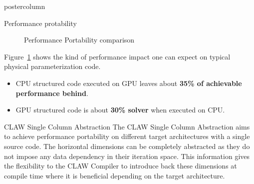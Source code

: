 \documentclass{beamer}
\begin{document}
\begin{frame}
\begin{columns}
\begin{column}{.43\textwidth}
\begin{beamercolorbox}[center]{postercolumn}
\begin{minipage}{.98\textwidth}
{\begin{myblock}{Performance protability}
\begin{figure}[ht]
\caption[Performance Portability comparison]{Performance Portability comparison}
\label{fig:perfportability}
\end{figure}

Figure~\ref{fig:perfportability} shows the kind of performance impact one can
expect on typical physical parameterization code.
\begin{itemize}
  \item CPU structured code executed on GPU leaves about \textbf{35\% of
        achievable performance behind}.
  \item GPU structured code is about \textbf{30\% solver} when executed on CPU.
\end{itemize}

\end{myblock}%

\begin{myblock}{CLAW Single Column Abstraction}
The CLAW Single Column Abstraction aims to achieve performance portability
on different target architectures with a single source code.
The horizontal dimensions can be completely abstracted as they do not impose
any data dependency in their iteration space.
This information gives the flexibility to the CLAW Compiler to introduce
back these dimensions at compile time where it is beneficial depending on the
target architecture.


\end{myblock}}
\end{minipage}
\end{beamercolorbox}
\end{column}
\end{columns}
\end{frame}
\end{document}
